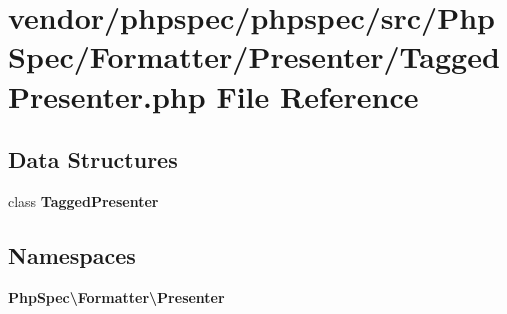 \section{vendor/phpspec/phpspec/src/\+Php\+Spec/\+Formatter/\+Presenter/\+Tagged\+Presenter.php File Reference}
\label{_tagged_presenter_8php}
\subsection*{Data Structures}
\begin{DoxyCompactItemize}
\item 
class {\bf Tagged\+Presenter}
\end{DoxyCompactItemize}
\subsection*{Namespaces}
\begin{DoxyCompactItemize}
\item 
 {\bf Php\+Spec\textbackslash{}\+Formatter\textbackslash{}\+Presenter}
\end{DoxyCompactItemize}
